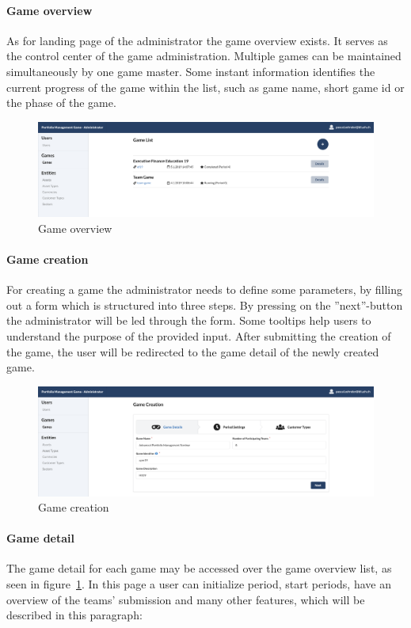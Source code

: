\paragraph{Game overview}
\label{paragraph:game_overview}
As for landing page of the administrator the game overview exists. It serves as the control center of the game administration. Multiple games can be maintained simultaneously by one game master. Some instant information identifies the current progress of the game within the list, such as game name, short game id or the phase of the game.
\begin{figure}[h!]
  \centering
  \includegraphics[scale=0.2]{img/application-overview/administrator/02_game_overview.png}
  \caption{Game overview}
  \label{fig:game_overview}
\end{figure}

\paragraph{Game creation}
For creating a game the administrator needs to define some parameters, by filling out a form which is structured into three steps. By pressing on the ''next''-button the administrator will be led through the form. Some tooltips help users to understand the purpose of the provided input. After submitting the creation of the game, the user will be redirected to the game detail of the newly created game.
\begin{figure}[h!]
  \centering
  \includegraphics[scale=0.2]{img/application-overview/administrator/03_game_creation.png}
  \caption{Game creation}
\end{figure}


\paragraph{Game detail}
The game detail for each game may be accessed over the game overview list, as seen in figure~\ref{fig:game_overview}. In this page a user can initialize period, start periods, have an overview of the teams' submission and many other features, which will be described in this paragraph:

